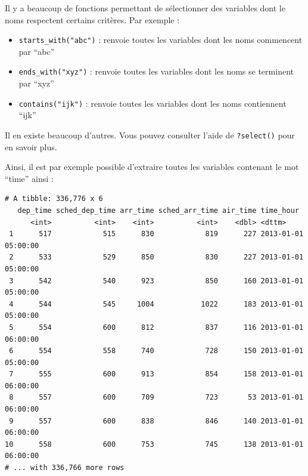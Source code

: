 \documentclass[a4paperpaper,]{article}
\newenvironment{Shaded}{\begin{snugshade}}{\end{snugshade}}
\newcommand{\KeywordTok}[1]{\textcolor[rgb]{0.12,0.11,0.11}{\textbf{#1}}}
\newcommand{\NormalTok}[1]{\textcolor[rgb]{0.12,0.11,0.11}{#1}}
\newcommand{\OperatorTok}[1]{\textcolor[rgb]{0.12,0.11,0.11}{#1}}
\newcommand{\StringTok}[1]{\textcolor[rgb]{0.75,0.01,0.01}{#1}}
\providecommand{\tightlist}{%
  \setlength{\itemsep}{0pt}\setlength{\parskip}{0pt}}
\theoremstyle{definition}
\theoremstyle{definition}
\theoremstyle{definition}
\theoremstyle{remark}
\begin{document}
Il y a beaucoup de fonctions permettant de sélectionner des variables
dont le noms respectent certains critères. Par exemple :

\begin{itemize}
\tightlist
\item
  \texttt{starts\_with("abc")} : renvoie toutes les variables dont les
  noms commencent par ``abc''
\item
  \texttt{ends\_with("xyz")} : renvoie toutes les variables dont les
  noms se terminent par ``xyz''
\item
  \texttt{contains("ijk")} : renvoie toutes les variables dont les noms
  contiennent ``ijk''
\end{itemize}

Il en existe beaucoup d'autres. Vous pouvez consulter l'aide de
\texttt{?select()} pour en savoir plus.

Ainsi, il est par exemple possible d'extraire toutes les variables
contenant le mot ``time'' ainsi :

\begin{Shaded}
\end{Shaded}

\begin{verbatim}
# A tibble: 336,776 x 6
   dep_time sched_dep_time arr_time sched_arr_time air_time time_hour          
      <int>          <int>    <int>          <int>    <dbl> <dttm>             
 1      517            515      830            819      227 2013-01-01 05:00:00
 2      533            529      850            830      227 2013-01-01 05:00:00
 3      542            540      923            850      160 2013-01-01 05:00:00
 4      544            545     1004           1022      183 2013-01-01 05:00:00
 5      554            600      812            837      116 2013-01-01 06:00:00
 6      554            558      740            728      150 2013-01-01 05:00:00
 7      555            600      913            854      158 2013-01-01 06:00:00
 8      557            600      709            723       53 2013-01-01 06:00:00
 9      557            600      838            846      140 2013-01-01 06:00:00
10      558            600      753            745      138 2013-01-01 06:00:00
# ... with 336,766 more rows
\end{verbatim}
\end{document}
